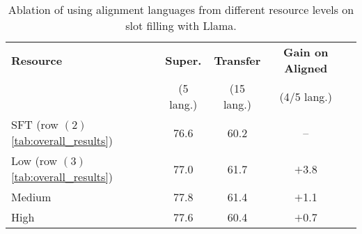 \begin{table}[t!]
    \small
    \centering
    \setlength\tabcolsep{1.1pt}
    \begin{tabular}{l c c c c}
    \toprule
    \textbf{Resource}
    &\textbf{Super.} 
    & \textbf{Transfer}
    & \textbf{Gain on Aligned}
    \\
    & 
    (5 lang.) &
    (15 lang.) &
    (4/5 lang.)
    \\
    \midrule
    SFT (row $(2)$ \autoref{tab:overall_results}) &
    76.6 &
    60.2 &
    --
    \\
    Low (row $(3)$ \autoref{tab:overall_results}) &
    77.0 & 
    61.7 & 
    $+$3.8 %
    \\
    Medium  &
    77.8 & 
    61.4 & 
    $+$1.1 %
    \\
    High  &
    77.6 & 
    60.4 & 
    $+$0.7 %
    \\
    \bottomrule
    \end{tabular}
    \caption{Ablation of using alignment languages from different resource levels on slot filling with Llama.
    \label{tab:resource_level}}
\end{table}
